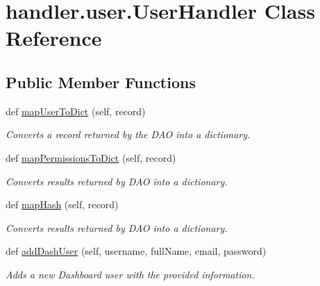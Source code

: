 \hypertarget{classhandler_1_1user_1_1_user_handler}{}\section{handler.\+user.\+User\+Handler Class Reference}
\label{classhandler_1_1user_1_1_user_handler}
\subsection*{Public Member Functions}
\begin{DoxyCompactItemize}
\item 
\mbox{\label{classhandler_1_1user_1_1_user_handler_a563bf510a65aefcc2d6988d18fce087f}} 
def \hyperlink{classhandler_1_1user_1_1_user_handler_a563bf510a65aefcc2d6988d18fce087f}{map\+User\+To\+Dict} (self, record)
\begin{DoxyCompactList}\small\item\em Converts a record returned by the D\+AO into a dictionary. \end{DoxyCompactList}\item 
\mbox{\label{classhandler_1_1user_1_1_user_handler_a68a4fcf8939d84849aa4b6bb63d25a65}} 
def \hyperlink{classhandler_1_1user_1_1_user_handler_a68a4fcf8939d84849aa4b6bb63d25a65}{map\+Permissions\+To\+Dict} (self, record)
\begin{DoxyCompactList}\small\item\em Converts results returned by D\+AO into a dictionary. \end{DoxyCompactList}\item 
\mbox{\label{classhandler_1_1user_1_1_user_handler_a6bebccaf5fa86ff02d81c65bff29ec87}} 
def \hyperlink{classhandler_1_1user_1_1_user_handler_a6bebccaf5fa86ff02d81c65bff29ec87}{map\+Hash} (self, record)
\begin{DoxyCompactList}\small\item\em Converts results returned by D\+AO into a dictionary. \end{DoxyCompactList}\item 
def \hyperlink{classhandler_1_1user_1_1_user_handler_a3d1e4cb462752aa66af5950b89c1feed}{add\+Dash\+User} (self, username, full\+Name, email, password)
\begin{DoxyCompactList}\small\item\em Adds a new Dashboard user with the provided information. \end{DoxyCompactList}\item 

\end{DoxyCompactItemize}
